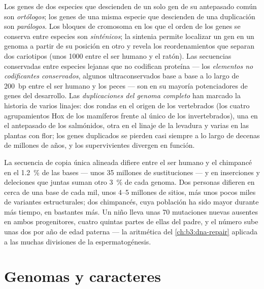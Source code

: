 \begin{definition}\label{def:b3:genomics:comparative}
Los genes de dos especies que descienden de un solo gen de su antepasado
común son \emph{ortólogos}; los genes de una misma especie que descienden
de una duplicación son \emph{parálogos}. Los bloques de cromosoma en los
que el orden de los genes se conserva entre especies son
\emph{sinténicos}; la sintenia permite localizar un gen en un genoma a
partir de su posición en otro y revela los reordenamientos que separan
dos cariotipos (unos \num{1000} entre el ser humano y el ratón). Las
secuencias conservadas entre especies lejanas que no codifican proteína
--- los \emph{elementos no codificantes conservados}, algunos
ultraconservados base a base a lo largo de \qty{200}{bp} entre el ser
humano y los peces --- son en su mayoría potenciadores de genes del
desarrollo. Las \emph{duplicaciones del genoma completo} han marcado la
historia de varios linajes: dos rondas en el origen de los vertebrados
(los cuatro agrupamientos Hox de los mamíferos frente al único de los
invertebrados), una en el antepasado de los salmónidos, otra en el linaje
de la levadura y varias en las plantas con flor; los genes duplicados se
pierden casi siempre a lo largo de decenas de millones de años, y los
supervivientes divergen en función.
\end{definition}

\begin{example}\label{ex:b3:genomics:chimp}
La secuencia de copia única alineada difiere entre el ser humano y el
chimpancé en el \qty{1.2}{\%} de las bases --- unos \num{35} millones de
sustituciones --- y en inserciones y deleciones que juntas suman otro
\qty{3}{\%} de cada genoma. Dos personas difieren en cerca de una base de
cada mil, unos \numrange{4}{5} millones de sitios, más unos pocos miles
de variantes estructurales; dos chimpancés, cuya población ha sido mayor
durante más tiempo, en bastantes más. Un niño lleva unas \num{70}
mutaciones nuevas ausentes en ambos progenitores, cuatro quintas partes
de ellas del padre, y el número sube unas dos por año de edad paterna ---
la aritmética del \cref{ch:b3:dna-repair} aplicada a las muchas
divisiones de la espermatogénesis.
\end{example}

\section{Genomas y caracteres}

